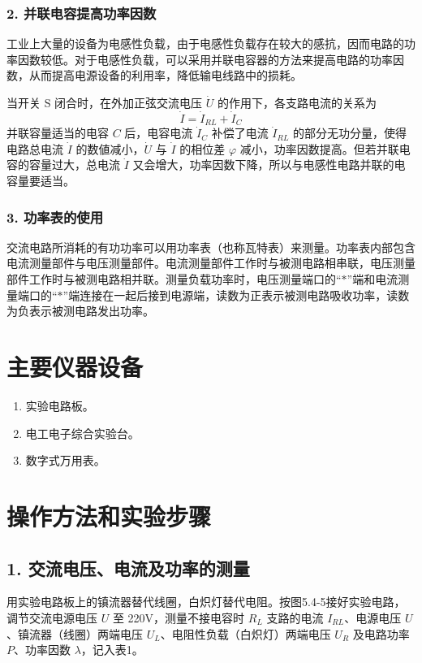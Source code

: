 \documentclass[10.5pt]{config}
\begin{document}
\subsubsection*{2. 并联电容提高功率因数}

工业上大量的设备为电感性负载，由于电感性负载存在较大的感抗，因而电路的功率因数较低。对于电感性负载，可以采用并联电容器的方法来提高电路的功率因数，从而提高电源设备的利用率，降低输电线路中的损耗。

当开关 S 闭合时，在外加正弦交流电压 $\dot{U}$ 的作用下，各支路电流的关系为
\begin{equation*}
    \dot{I} = \dot{I}_{RL} + \dot{I}_C
\end{equation*}
并联容量适当的电容 $C$ 后，电容电流 $\dot{I}_C$ 补偿了电流 $\dot{I}_{RL}$ 的部分无功分量，使得电路总电流 $\dot{I}$ 的数値减小，$\dot{U}$ 与 $\dot{I}$ 的相位差 $\varphi$ 减小，功率因数提高。但若并联电容的容量过大，总电流 $\dot{I}$ 又会增大，功率因数下降，所以与电感性电路并联的电容量要适当。

\subsubsection*{3. 功率表的使用}

交流电路所消耗的有功功率可以用功率表（也称瓦特表）来测量。功率表内部包含电流测量部件与电压测量部件。电流测量部件工作时与被测电路相串联，电压测量部件工作时与被测电路相并联。测量负载功率时，电压测量端口的“$*$”端和电流测量端口的“$*$”端连接在一起后接到电源端，读数为正表示被测电路吸收功率，读数为负表示被测电路发出功率。



\section{主要仪器设备}
\begin{enumerate}[label=\arabic*., leftmargin=2em]
    \item 实验电路板。
    \item 电工电子综合实验台。
    \item 数字式万用表。

\end{enumerate}

\section{操作方法和实验步骤}

\subsection*{1. 交流电压、电流及功率的测量}
用实验电路板上的镇流器替代线圈，白炽灯替代电阻。按图5.4-5接好实验电路，调节交流电源电压 $U$ 至 220V，测量不接电容时 $R_L$ 支路的电流 $I_{RL}$、电源电压 $U$、镇流器（线圈）两端电压 $U_L$、电阻性负载（白炽灯）两端电压 $U_R$ 及电路功率 $P$、功率因数 $\lambda$，记入表1。
\end{document}
